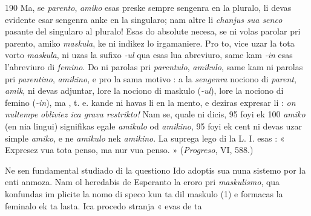 \begin{VUpage}[194]{190}
{Ma, se \textit{parento}, \textit{amiko} esas preske sempre sengenra en la pluralo,\nl
li devas evidente esar sengenra anke en la singularo; nam altre li\nl
\textit{chanjus sua senco} pasante del singularo al pluralo! Esas do absolute\nl
necesa, se ni volas parolar pri parento, amiko \textit{maskula}, ke ni indikez\nl
lo irgamaniere. Pro to, vice uzar la tota vorto \textit{maskula}, ni uzas\nl
la sufixo \textit{-ul} qua esas lua abreviuro, same kam \textit{-in} esas l'abreviuro\nl
di \textit{femino}. Do ni parolas pri \textit{parentulo}, \textit{amikulo}, same kam ni parolas\nl
pri \textit{parentino}, \textit{amikino}, e pro la sama motivo : a la \textit{sengenra} nociono\nl
di \textit{parent}, \textit{amik}, ni devas adjuntar, lore la nociono di maskulo (\textit{-ul}),\nl
lore la nociono di femino (\textit{-in}), ma , t. e.\nl
kande ni havas li en la mento, e deziras expresar li : \textit{on nultempe}\nl
\textit{obliviez ica grava restrikto!} Nam se, quale ni dicis, 95 foyi ek 100\nl
\textit{amiko} (en nia lingui) signifikas egale \textit{amikulo} od \textit{amikino}, 95 foyi\nl
ek cent ni devas uzar simple \textit{amiko}, e ne \textit{amikulo} nek \textit{amikino}. La\nl
suprega lego di la L. I. esas : « Expresez vua tota penso, ma nur\nl
vua penso. » (\textit{Progreso}, VI, 588.)%
}

Ne sen fundamental studiado di la questiono Ido adoptis\nl
sua nuna sistemo por la enti anmoza. Nam ol heredabis\nl
de Esperanto la eroro pri \textit{maskulismo}, qua konfundas im\cc
plicite la nomo di speco kun ta dil maskulo (1) e formacas\nl
la feminalo ek ta lasta. Ica procedo stranja « evas de ta\parplein
\end{VUpage}

